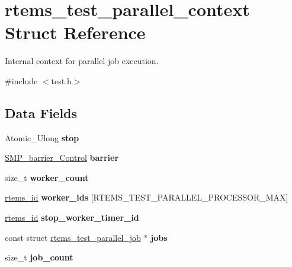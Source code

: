 \hypertarget{structrtems__test__parallel__context}{}\section{rtems\+\_\+test\+\_\+parallel\+\_\+context Struct Reference}
\label{structrtems__test__parallel__context}


Internal context for parallel job execution.  




{\ttfamily \#include $<$test.\+h$>$}

\subsection*{Data Fields}
\begin{DoxyCompactItemize}
\item 
\mbox{\label{structrtems__test__parallel__context_abc721469d3696560f0862a138ff01170}} 
Atomic\+\_\+\+Ulong {\bfseries stop}
\item 
\mbox{\label{structrtems__test__parallel__context_a9cac92cf1d7e06cd719ff8c5badfd18a}} 
\mbox{\hyperlink{structSMP__barrier__Control}{S\+M\+P\+\_\+barrier\+\_\+\+Control}} {\bfseries barrier}
\item 
\mbox{\label{structrtems__test__parallel__context_ae62630d363e996ab45a12610be372b48}} 
size\+\_\+t {\bfseries worker\+\_\+count}
\item 
\mbox{\label{structrtems__test__parallel__context_af5fd388469bbe223b9d9f512f16fd30e}} 
\mbox{\hyperlink{group__ClassicTasks_gab20892b814dced7dd4e5b9bf42becd57}{rtems\+\_\+id}} {\bfseries worker\+\_\+ids} \mbox{[}R\+T\+E\+M\+S\+\_\+\+T\+E\+S\+T\+\_\+\+P\+A\+R\+A\+L\+L\+E\+L\+\_\+\+P\+R\+O\+C\+E\+S\+S\+O\+R\+\_\+\+M\+AX\mbox{]}
\item 
\mbox{\label{structrtems__test__parallel__context_a036a2944ba6c477c72197c63d82af7c8}} 
\mbox{\hyperlink{group__ClassicTasks_gab20892b814dced7dd4e5b9bf42becd57}{rtems\+\_\+id}} {\bfseries stop\+\_\+worker\+\_\+timer\+\_\+id}
\item 
\mbox{\label{structrtems__test__parallel__context_a6c032bf4452cb6b8bd2aa5970a5e24cb}} 
const struct \mbox{\hyperlink{structrtems__test__parallel__job}{rtems\+\_\+test\+\_\+parallel\+\_\+job}} $\ast$ {\bfseries jobs}
\item 
\mbox{\label{structrtems__test__parallel__context_acb349a60e67acc5db7f2351f873e2231}} 
size\+\_\+t {\bfseries job\+\_\+count}
\end{DoxyCompactItemize}


